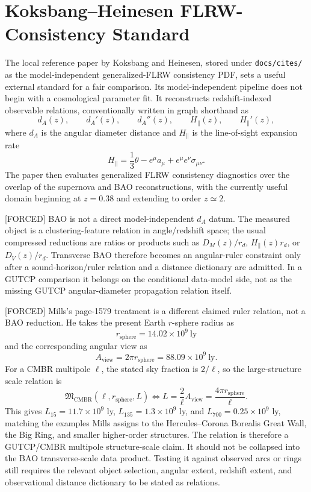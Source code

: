\documentclass[11pt]{article}
\begin{document}
\section*{Koksbang--Heinesen FLRW-Consistency Standard}

The local reference paper by Koksbang and Heinesen, stored under
\texttt{docs/cites/} as the model-independent generalized-FLRW consistency PDF,
sets a useful external standard for a fair comparison.  Its model-independent
pipeline does not begin with a cosmological parameter fit.  It reconstructs
redshift-indexed observable relations, conventionally written in graph
shorthand as
\begin{equation}
d_A(z),\qquad d_A'(z),\qquad d_A''(z),\qquad
H_{\parallel}(z),\qquad H_{\parallel}'(z),
\label{eq:kh-input-bundle}
\end{equation}
where \(d_A\) is the angular diameter distance and \(H_{\parallel}\) is the
line-of-sight expansion rate
\begin{equation}
H_{\parallel}=\frac{1}{3}\theta-e^\mu a_\mu+e^\mu e^\nu\sigma_{\mu\nu}.
\label{eq:kh-line-of-sight-h}
\end{equation}
The paper then evaluates generalized FLRW consistency diagnostics over the
overlap of the supernova and BAO reconstructions, with the currently useful
domain beginning at \(z=0.38\) and extending to order \(z\simeq2\).

[FORCED] BAO is not a direct model-independent \(d_A\) datum.  The measured
object is a clustering-feature relation in angle/redshift space; the usual
compressed reductions are ratios or products such as \(D_M(z)/r_d\),
\(H_{\parallel}(z)r_d\), or \(D_V(z)/r_d\).  Transverse BAO therefore becomes
an angular-ruler constraint only after a sound-horizon/ruler relation and a
distance dictionary are admitted.  In a GUTCP comparison it belongs on the
conditional data-model side, not as the missing GUTCP angular-diameter
propagation relation itself.

[FORCED] Mills's page-1579 treatment is a different claimed ruler relation,
not a BAO reduction.  He takes the present Earth \(r\)-sphere radius as
\[
r_{\mathrm{sphere}}=14.02\times10^9\ \mathrm{ly}
\]
and the corresponding angular view as
\[
A_{\mathrm{view}}=2\pi r_{\mathrm{sphere}}
=88.09\times10^9\ \mathrm{ly}.
\]
For a CMBR multipole \(\ell\), the stated sky fraction is \(2/\ell\), so the
large-structure scale relation is
\begin{equation}
\mathfrak{M}_{\mathrm{CMBR}}
(\ell,r_{\mathrm{sphere}},L)
\Longleftrightarrow
L=\frac{2}{\ell}A_{\mathrm{view}}
=\frac{4\pi r_{\mathrm{sphere}}}{\ell}.
\label{eq:mills-cmbr-structure-scale}
\end{equation}
This gives \(L_{15}=11.7\times10^9\) ly, \(L_{135}=1.3\times10^9\) ly, and
\(L_{700}=0.25\times10^9\) ly, matching the examples Mills assigns to the
Hercules--Corona Borealis Great Wall, the Big Ring, and smaller higher-order
structures.  The relation is therefore a GUTCP/CMBR multipole structure-scale
claim.  It should not be collapsed into the BAO transverse-scale data product.
Testing it against observed arcs or rings still requires the relevant object
selection, angular extent, redshift extent, and observational distance
dictionary to be stated as relations.
\end{document}
